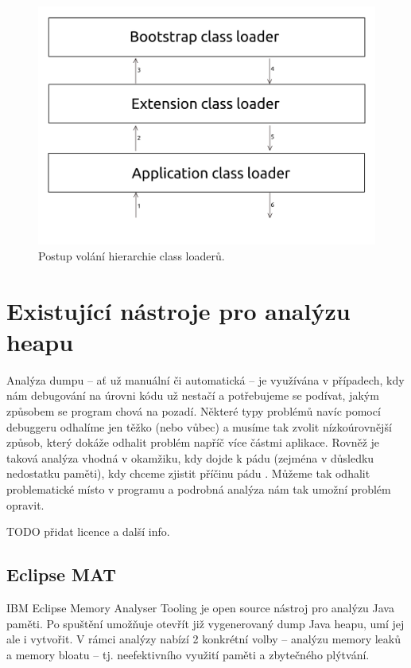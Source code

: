 \begin{figure}[ht!]
	\centering
	\includegraphics[scale=0.5]{obrazky/class-loader.png}
	\caption{Postup volání hierarchie class loaderů.}
	\label{obr-class-loader}
\end{figure}






\chapter{Existující nástroje pro analýzu heapu}
\label{existing-solutions}
Analýza dumpu -- ať už manuální či automatická -- je využívána v případech, kdy nám debugování na úrovni kódu už nestačí a potřebujeme se podívat, jakým způsobem se program chová na pozadí. Některé typy problémů navíc pomocí debuggeru odhalíme jen těžko (nebo vůbec) a musíme tak zvolit nízkoúrovnější způsob, který dokáže odhalit problém napříč více částmi aplikace. Rovněž je taková analýza vhodná v okamžiku, kdy dojde k pádu (zejména v důsledku nedostatku paměti), kdy chceme zjistit příčinu pádu . Můžeme tak odhalit problematické místo v programu a podrobná analýza nám tak umožní problém opravit.

TODO přidat licence a další info.

\section{Eclipse MAT}
IBM Eclipse Memory Analyser Tooling je open source nástroj pro analýzu Java paměti. Po spuštění umožňuje otevřít již vygenerovaný dump Java heapu, umí jej ale i vytvořit. V rámci analýzy nabízí 2 konkrétní volby – analýzu memory leaků a memory bloatu – tj. neefektivního využití paměti a zbytečného plýtvání. 


